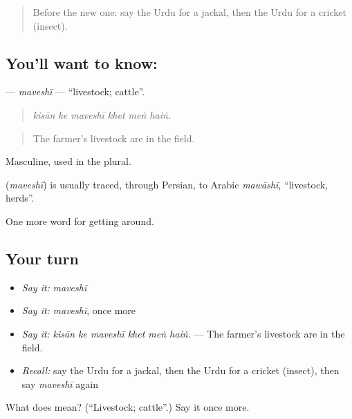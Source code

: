 \begin{quote}
Before the new one: say the Urdu for a jackal, then the Urdu for a cricket (insect).
\end{quote}

\subsection*{You'll want to know: }
\textbf{} — \emph{maveshī} — \textquotedblleft{}livestock; cattle\textquotedblright{}.

\begin{quote}
     
\end{quote}

\begin{quote}
\emph{kisān ke maveshī khet meṅ haiṅ.}
\end{quote}

\begin{quote}
The farmer's livestock are in the field.
\end{quote}

Masculine, used in the plural.

\begin{cousinweb}
\textbf{} (\emph{maveshī}) is usually traced, through Persian, to Arabic \emph{mawāshī}, \textquotedblleft{}livestock, herds\textquotedblright{}.
\end{cousinweb}

\begin{grammarlens}[title={What you've built}]
One more word for getting around.
\end{grammarlens}

\subsection*{Your turn}
\begin{itemize}
\raggedright
  \item \emph{Say it:} \emph{maveshī}
  \item \emph{Say it:} \emph{maveshī}, once more
  \item \emph{Say it:} \emph{kisān ke maveshī khet meṅ haiṅ.} — The farmer's livestock are in the field.
  \item \emph{Recall:} say the Urdu for a jackal, then the Urdu for a cricket (insect), then say \emph{maveshī} again
\end{itemize}

\begin{tcolorbox}[breakable,colback=teal!4,colframe=teal!35!black,title={Before you move on}]
What does  mean? (\textquotedblleft{}Livestock; cattle\textquotedblright{}.) Say it once more.
\end{tcolorbox}
